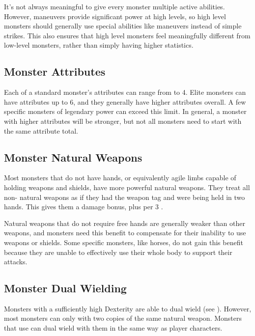             It's not always meaningful to give every monster multiple active abilities.
            However, maneuvers provide significant power at high levels, so high level monsters should generally use special abilities like maneuvers instead of simple strikes.
            This also ensures that high level monsters feel meaningfully different from low-level monsters, rather than simply having higher statistics.

    \subsection{Monster Attributes}\label{Monster Attributes}
        Each of a standard monster's attributes can range from  to 4.
        Elite monsters can have attributes up to 6, and they generally have higher attributes overall.
        A few specific monsters of legendary power can exceed this limit.
        In general, a monster with higher attributes will be stronger, but not all monsters need to start with the same attribute total.

    \subsection{Monster Natural Weapons}\label{Monster Natural Weapon}
        Most monsters that do not have hands, or equivalently agile limbs capable of holding weapons and shields, have more powerful natural weapons.
        They treat all non- natural weapons as if they had the  weapon tag and were being held in two hands.
        This gives them a  damage bonus, plus  per 3 .

        Natural weapons that do not require free hands are generally weaker than other weapons, and monsters need this benefit to compensate for their inability to use weapons or shields.
        Some specific monsters, like horses, do not gain this benefit because they are unable to effectively use their whole body to support their attacks.

    \subsection{Monster Dual Wielding}\label{Monster Dual Wielding}
        Monsters with a sufficiently high Dexterity are able to dual wield (see ).
        However, most monsters can only  with two copies of the same  natural weapon.
        Monsters that use  can dual wield with them in the same way as player characters.


